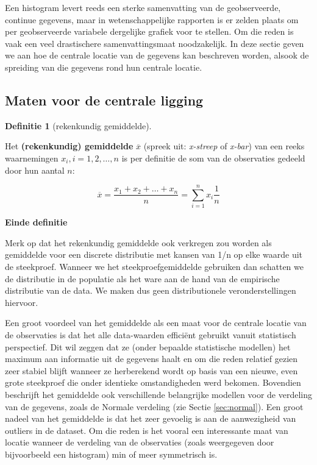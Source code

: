\documentclass[
  12pt,dutch,coursenotes]{book}
\theoremstyle{definition}
\newtheorem{definition}{Definitie}[chapter]
\theoremstyle{definition}
\theoremstyle{definition}
\theoremstyle{remark}
\begin{document}
Een histogram levert reeds een sterke samenvatting van de geobserveerde,
continue gegevens, maar in wetenschappelijke rapporten is er zelden
plaats om per geobserveerde variabele dergelijke grafiek voor te stellen. Om
die reden is vaak een veel drastischere samenvattingsmaat noodzakelijk. In deze
sectie geven we aan hoe de centrale locatie van de gegevens kan beschreven
worden, alsook de spreiding van die gegevens rond hun centrale locatie.

\hypertarget{maten-voor-de-centrale-ligging}{%
\subsection{Maten voor de centrale ligging}\label{maten-voor-de-centrale-ligging}}

\begin{definition}[rekenkundig gemiddelde]
\protect\hypertarget{def:unnamed-chunk-93}{}{\label{def:unnamed-chunk-93} \iffalse (rekenkundig gemiddelde) \fi{} }
\end{definition}
Het \textbf{(rekenkundig) gemiddelde} \(\overline{x}\) (spreek uit: \emph{x-streep}
of \emph{x-bar}) van een reeks waarnemingen \(x_i, i=1, 2, \dots, n\) is per
definitie de som van de observaties gedeeld door hun aantal \(n\):

\[\overline{x}= \frac{x_1 + x_2 + \dots + x_n}{n} =\sum_{i=1}^n x_i \frac{1}{n} \]

\textbf{Einde definitie}

Merk op dat het rekenkundig gemiddelde ook verkregen zou worden als gemiddelde voor een discrete distributie met kansen van 1/n op elke waarde uit de steekproef.
Wanneer we het steekproefgemiddelde gebruiken dan schatten we de distributie in de populatie als het ware aan de hand van de empirische distributie van de data. We maken dus geen distributionele veronderstellingen hiervoor.

Een groot voordeel van het gemiddelde als een maat voor de centrale locatie
van de observaties is dat het alle data-waarden efficiënt gebruikt vanuit
statistisch perspectief. Dit wil zeggen dat ze (onder bepaalde statistische modellen)
het maximum aan informatie
uit de gegevens haalt en om die reden relatief gezien zeer stabiel blijft
wanneer ze herberekend wordt op basis van een nieuwe, even grote steekproef
die onder identieke omstandigheden werd bekomen. Bovendien beschrijft het
gemiddelde ook verschillende belangrijke modellen voor de verdeling van de
gegevens, zoals de Normale verdeling (zie Sectie \ref{sec:normal}). Een
groot nadeel van het gemiddelde is dat het zeer gevoelig is aan de
aanwezigheid van outliers in de dataset. Om die reden is het vooral een
interessante maat van locatie wanneer de verdeling van de observaties (zoals
weergegeven door bijvoorbeeld een histogram) min of meer symmetrisch is.
\end{document}
